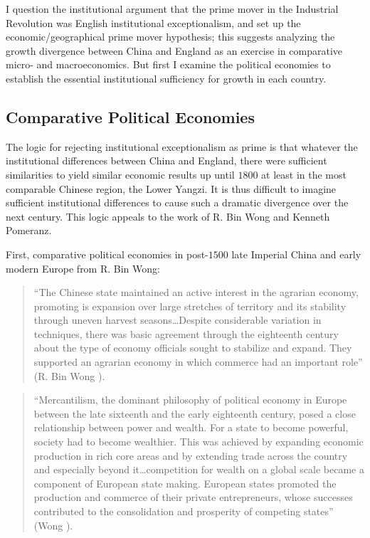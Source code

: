 \documentclass[12pt]{article}
\numberwithin{equation}{section}
\begin{document}
		I question the institutional argument that the prime mover in the Industrial Revolution was English institutional exceptionalism, and set up the economic/geographical prime mover hypothesis; this suggests analyzing the growth divergence between China and England as an exercise in comparative micro- and macroeconomics. But first I examine the political economies to establish the essential institutional sufficiency for growth in each country.
		\newpage

		\subsection*{Comparative Political Economies }
		
		The logic for rejecting institutional exceptionalism as prime is that whatever the institutional differences between China and England, there were sufficient similarities to yield similar economic results up until $1800$ at least in the most comparable Chinese region, the Lower Yangzi. It is thus difficult to imagine sufficient institutional differences to cause such a dramatic divergence over the next century. This logic appeals to the work of R. Bin Wong and Kenneth Pomeranz.
		
		First, comparative political economies in post-$1500$ late Imperial China and early modern Europe from R. Bin Wong:
		
		\begin{quotation}
		
		``The Chinese state maintained an active interest in the agrarian economy, promoting is expansion over large stretches of territory and its stability through uneven harvest seasons\ldots Despite considerable variation in techniques, there was basic agreement through the eighteenth century about the type of economy officials sought to stabilize and expand. They supported an agrarian economy in which commerce had an important role'' (R. Bin Wong \citeyear[pp.~115--16]{wong_china_1997}).
		\end{quotation}
		
		\begin{quotation}
		``Mercantilism, the dominant philosophy of political economy in Europe between the late sixteenth and the early eighteenth century, posed a close relationship between power and wealth. For a state to become powerful, society had to become wealthier. This was achieved by expanding economic production in rich core areas and by extending trade across the country and especially beyond it\ldots competition for wealth on a global scale became a component of European state making. European states promoted the production and commerce of their private entrepreneurs, whose successes contributed to the consolidation and prosperity of competing states'' (Wong \citeyear[p.~140]{wong_china_1997}).
		
		\end{quotation}
		
\end{document}
